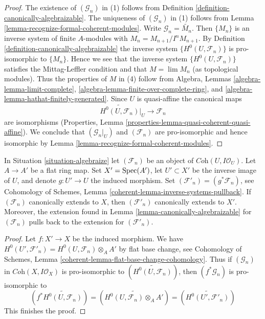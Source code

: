 \begin{proof}
The existence of $(\mathcal{G}_n)$ in (1) follows from
Definition \ref{definition-canonically-algebraizable}.
The uniqueness of $(\mathcal{G}_n)$ in (1) follows from
Lemma \ref{lemma-recognize-formal-coherent-modules}.
Write $\mathcal{G}_n = \widetilde{M_n}$.
Then $\{M_n\}$ is an inverse system of finite $A$-modules
with $M_n = M_{n + 1}/I^n M_{n + 1}$.
By Definition \ref{definition-canonically-algebraizable}
the inverse system $\{H^0(U, \mathcal{F}_n)\}$
is pro-isomorphic to $\{M_n\}$.
Hence we see that the inverse system $\{H^0(U, \mathcal{F}_n)\}$
satisfies the Mittag-Leffler condition and that
$M = \lim M_n$ (as topological modules).
Thus the properties of $M$ in (4) follow from
Algebra, Lemmas \ref{algebra-lemma-limit-complete},
\ref{algebra-lemma-finite-over-complete-ring}, and
\ref{algebra-lemma-hathat-finitely-generated}.
Since $U$ is quasi-affine the canonical maps
$$
\widetilde{H^0(U, \mathcal{F}_n)}|_U \to \mathcal{F}_n
$$
are isomorphisms (Properties, Lemma
\ref{properties-lemma-quasi-coherent-quasi-affine}).
We conclude that $(\mathcal{G}_n|_U)$ and $(\mathcal{F}_n)$ are
pro-isomorphic and hence isomorphic by
Lemma \ref{lemma-recognize-formal-coherent-modules}.
\end{proof}

\begin{lemma}
\label{lemma-canonically-extend-base-change}
In Situation \ref{situation-algebraize} let $(\mathcal{F}_n)$ be an
object of $\textit{Coh}(U, I\mathcal{O}_U)$. Let $A \to A'$ be a flat ring
map. Set $X' = \mathop{\mathrm{Spec}}(A')$, let $U' \subset X'$ be the inverse image of $U$,
and denote $g : U' \to U$ the induced morphism. Set
$(\mathcal{F}'_n) = (g^*\mathcal{F}_n)$, see
Cohomology of Schemes, Lemma \ref{coherent-lemma-inverse-systems-pullback}.
If $(\mathcal{F}_n)$ canonically extends to $X$, then
$(\mathcal{F}'_n)$ canonically extends to $X'$.
Moreover, the extension found in Lemma \ref{lemma-canonically-algebraizable}
for $(\mathcal{F}_n)$ pulls back to the extension for
$(\mathcal{F}'_n)$.
\end{lemma}

\begin{proof}
Let $f : X' \to X$ be the induced morphism.
We have $H^0(U', \mathcal{F}'_n) = H^0(U, \mathcal{F}_n) \otimes_A A'$ by
flat base change, see Cohomology of Schemes, Lemma
\ref{coherent-lemma-flat-base-change-cohomology}.
Thus if $(\mathcal{G}_n)$ in $\textit{Coh}(X, I\mathcal{O}_X)$
is pro-isomorphic to $(\widetilde{H^0(U, \mathcal{F}_n)})$, then
$(f^*\mathcal{G}_n)$ is pro-isomorphic to
$$
(f^*\widetilde{H^0(U, \mathcal{F}_n)}) =
(\widetilde{H^0(U, \mathcal{F}_n) \otimes_A A'}) =
(\widetilde{H^0(U', \mathcal{F}'_n)})
$$
This finishes the proof.
\end{proof}

